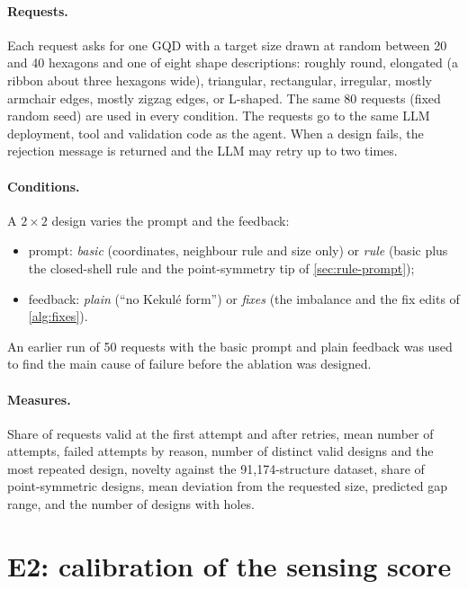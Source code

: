 \paragraph{Requests.} Each request asks for one GQD with a target size drawn at random between 20
and 40 hexagons and one of eight shape descriptions: roughly round, elongated (a ribbon about three
hexagons wide), triangular, rectangular, irregular, mostly armchair edges, mostly zigzag edges, or
L-shaped. The same 80 requests (fixed random seed) are used in every condition. The requests go to
the same LLM deployment, tool and validation code as the agent. When a design fails, the rejection
message is returned and the LLM may retry up to two times.

\paragraph{Conditions.} A \(2 \times 2\) design varies the prompt and the feedback:
\begin{itemize}
  \item prompt: \emph{basic} (coordinates, neighbour rule and size only) or \emph{rule} (basic
        plus the closed-shell rule and the point-symmetry tip of \cref{sec:rule-prompt});
  \item feedback: \emph{plain} (``no Kekul\'e form'') or \emph{fixes} (the imbalance and the fix
        edits of \cref{alg:fixes}).
\end{itemize}
An earlier run of 50 requests with the basic prompt and plain feedback was used to find the main
cause of failure before the ablation was designed.

\paragraph{Measures.} Share of requests valid at the first attempt and after retries, mean number
of attempts, failed attempts by reason, number of distinct valid designs and the most repeated
design, novelty against the 91{,}174-structure dataset, share of point-symmetric designs, mean
deviation from the requested size, predicted gap range, and the number of designs with holes.

\section{E2: calibration of the sensing score}
\label{sec:e2}

